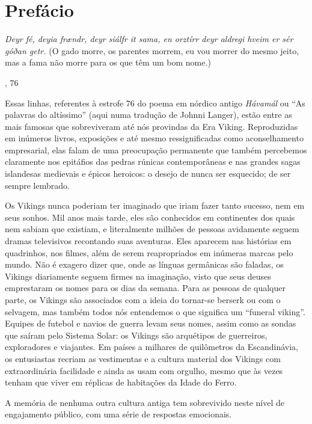 \chapter[Prefácio, \emph{por Neil Price}]{Prefácio}\label{prefuxe1cio}

\epigraph{\emph{%
Deyr fé, deyia frændr, deyr siálfr it sama, en orztírr deyr aldregi
hveim er sér góðan getr.}\linebreak
(O gado morre, os parentes morrem, eu vou morrer do mesmo jeito, mas a
fama não morre para os que têm um bom nome.)}{, 76}

Essas linhas, referentes à estrofe 76 do poema em nórdico antigo
\emph{Hávamál} ou ``As palavras do altíssimo'' (aqui numa tradução de
Johnni Langer), estão entre as mais famosas que sobreviveram até nós
provindas da Era Viking. Reproduzidas em inúmeros livros, exposições e
até mesmo ressignificadas como aconselhamento empresarial, elas falam de
uma preocupação permanente que também percebemos claramente nos
epitáfios das pedras rúnicas contemporâneas e nas grandes sagas
islandesas medievais e épicos heroicos: o desejo de nunca ser esquecido; de ser sempre lembrado.

Os Vikings nunca poderiam ter imaginado que iriam fazer tanto sucesso,
nem em seus sonhos. Mil anos mais tarde, eles são conhecidos em
continentes dos quais nem sabiam que existiam, e literalmente milhões
de pessoas avidamente seguem dramas televisivos recontando suas
aventuras. Eles aparecem nas histórias em quadrinhos, nos filmes, além de serem
reapropriados em inúmeras marcas pelo mundo. Não é exagero dizer que,
onde as línguas germânicas são faladas, os Vikings diariamente seguem
firmes na imaginação, visto que seus deuses emprestaram os nomes para os
dias da semana. Para as pessoas de qualquer parte, os Vikings são
associados com a ideia do tornar-se berserk ou com o selvagem, mas também
todos nós entendemos o que significa um ``funeral viking''. Equipes de
futebol e navios de guerra levam seus nomes, assim como as sondas que
saíram pelo Sistema Solar: os Vikings são arquétipos de guerreiros,
exploradores e viajantes. Em países a milhares de quilômetros da
Escandinávia, os entusiastas recriam as vestimentas e a cultura material
dos Vikings com extraordinária facilidade e ainda as usam com orgulho,
mesmo que às vezes tenham que viver em réplicas de habitações da Idade
do Ferro.

A memória de nenhuma outra cultura antiga tem sobrevivido neste nível de
engajamento público, com uma série de respostas emocionais.

